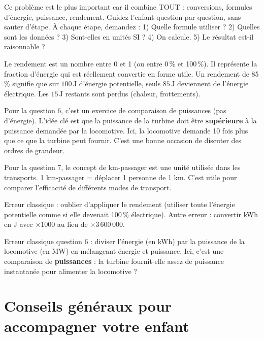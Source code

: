 \documentclass[11pt,a4paper]{article}
\newcommand{\tipbox}[1]{
\begin{tcolorbox}[colback=tipblue!8!white,colframe=tipblue!60!black,title=\textbf{Comment expliquer}]
#1
\end{tcolorbox}
}
\newcommand{\warnbox}[1]{
\begin{tcolorbox}[colback=warnred!8!white,colframe=warnred!60!black,title=\textbf{Erreurs fr\'equentes}]
#1
\end{tcolorbox}
}
\begin{document}
\tipbox{
Ce probl\`eme est le plus important car il combine TOUT : conversions, formules d'\'energie, puissance, rendement. Guidez l'enfant question par question, sans sauter d'\'etape. \`A chaque \'etape, demandez : 1) Quelle formule utiliser ? 2) Quelles sont les donn\'ees ? 3) Sont-elles en unit\'es SI ? 4) On calcule. 5) Le r\'esultat est-il raisonnable ?
}

\tipbox{
Le rendement est un nombre entre 0 et 1 (ou entre 0\,\% et 100\,\%). Il repr\'esente la fraction d'\'energie qui est r\'eellement convertie en forme utile. Un rendement de 85\,\% signifie que sur $100\,\text{J}$ d'\'energie potentielle, seuls $85\,\text{J}$ deviennent de l'\'energie \'electrique. Les $15\,\text{J}$ restants sont perdus (chaleur, frottements).
}

\tipbox{
Pour la question 6, c'est un exercice de comparaison de puissances (pas d'\'energie). L'id\'ee cl\'e est que la puissance de la turbine doit \^etre \textbf{sup\'erieure} \`a la puissance demand\'ee par la locomotive. Ici, la locomotive demande 10 fois plus que ce que la turbine peut fournir. C'est une bonne occasion de discuter des ordres de grandeur.

\vspace{0.2cm}
Pour la question 7, le concept de \guillemotleft{} km-passager \guillemotright{} est une unit\'e utilis\'ee dans les transports. 1 km-passager = d\'eplacer 1 personne de 1 km. C'est utile pour comparer l'efficacit\'e de diff\'erents modes de transport.
}

\warnbox{
Erreur classique : oublier d'appliquer le rendement (utiliser toute l'\'energie potentielle comme si elle devenait 100\,\% \'electrique). Autre erreur : convertir kWh en J avec $\times 1000$ au lieu de $\times 3\,600\,000$.

\vspace{0.2cm}
Erreur classique question 6 : diviser l'\'energie (en kWh) par la puissance de la locomotive (en MW) en m\'elangeant \'energie et puissance. Ici, c'est une comparaison de \textbf{puissances} : la turbine fournit-elle assez de puissance instantan\'ee pour alimenter la locomotive ?
}

\section*{Conseils g\'en\'eraux pour accompagner votre enfant}
\end{document}
